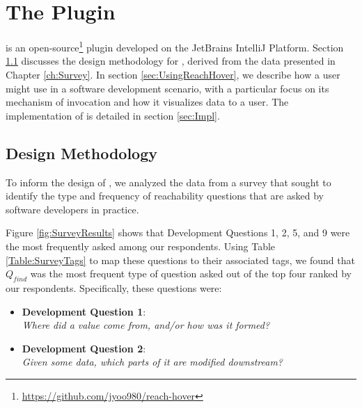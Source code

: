 
\chapter{The \toolname{} Plugin}
\label{ch:Tool}


\noindent \toolname{} is an open-source\footnote{\url{https://github.com/jyoo980/reach-hover}}
plugin developed on the JetBrains IntelliJ Platform.
Section \ref{sec:DesignMeth} discusses the design methodology for \toolname{},
derived from the data presented in Chapter \ref{ch:Survey}.
In section \ref{sec:UsingReachHover}, we describe how a user might use
\toolname{} in a software development scenario, with a particular focus on
its mechanism of invocation and how it visualizes data to a user.
The implementation of \toolname{} is detailed in section
\ref{sec:Impl}.

\section{Design Methodology}
\label{sec:DesignMeth}

\noindent To inform the design of \toolname{}, we analyzed the data from a 
survey that sought to identify the type and frequency of reachability questions 
that are asked by software developers in practice.

Figure \ref{fig:SurveyResults} shows that Development Questions 1, 2, 5, and 9
were the most frequently asked among our respondents.
Using Table \ref{Table:SurveyTags} to map these questions to their associated
tags, we found that $Q_{find}$ was the most frequent type of question asked out
of the top four ranked by our respondents.
Specifically, these questions were:

\begin{itemize}
  \item[] \textbf{Development Question 1}:\\ \textit{Where did a value come from,
  and/or how was it formed?}
  \item[] \textbf{Development Question 2}:\\ \textit{Given some data, which
  parts of it are modified downstream?}
\end{itemize}

